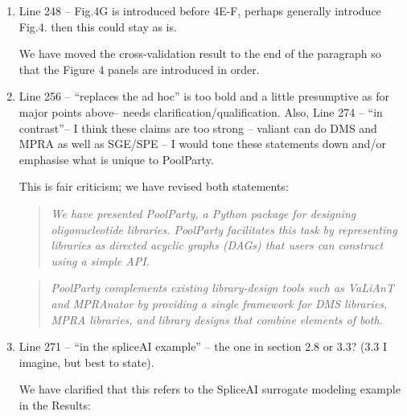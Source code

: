 \documentclass[11pt]{article}
\newenvironment{response}{\par\color{responseblue}}{\par}
\newenvironment{msquote}
  {\begin{quote}\color{responseblue}\itshape\noindent\ignorespaces}
  {\end{quote}}
\begin{document}
\begin{enumerate}
\begin{msquote}
Using the 5'ss of SMN2 exon~7 as the canonical site, we used PoolParty to construct a library in which cryptic 5'ss 9-mers of varying strength
(MaxEntScan score) were inserted at varying positions on either side of the canonical 5'ss (see Implementation).
\end{msquote}

\item Line 248 -- Fig.4G is introduced before 4E-F, perhaps generally introduce
Fig.4. then this could stay as is.

\begin{response}
We have moved the cross-validation result to the end of the paragraph so that
the Figure 4 panels are introduced in order. 
\end{response}

\item Line 256 -- ``replaces the ad hoc'' is too bold and a little presumptive as
for major points above-- needs clarification/qualification. Also, Line 274 --
``in contrast''-- I think these claims are too strong -- valiant can do DMS and
MPRA as well as SGE/SPE -- I would tone these statements down and/or emphasise
what is unique to PoolParty.

\begin{response}
This is fair criticism; we have revised both statements:
\end{response}

\begin{msquote}
We have presented PoolParty, a Python package for designing oligonucleotide libraries. PoolParty facilitates this task by representing libraries as directed acyclic graphs (DAGs) that users can construct using a simple API.
\end{msquote}

\begin{msquote}
PoolParty complements existing library-design tools such as VaLiAnT \citep{Barbon2022th} and MPRAnator \citep{GeorgakopoulosSoares2017gb} by
providing a single framework for DMS libraries, MPRA libraries, and library designs that combine elements of both.
\end{msquote}

\item Line 271 -- ``in the spliceAI example'' -- the one in section 2.8 or 3.3?
(3.3 I imagine, but best to state).

\begin{response}
We have clarified that this refers to the SpliceAI surrogate modeling example in the Results:
\end{response}


\end{enumerate}
\end{document}
